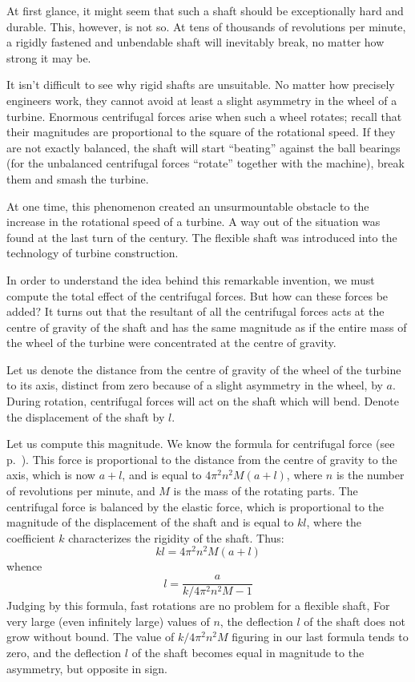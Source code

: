 At first glance, it might seem that such a shaft should
be exceptionally hard and durable. This, however, is
not so. At tens of thousands of revolutions per minute,
a rigidly fastened and unbendable shaft will inevitably
break, no matter how strong it may be.

It isn't difficult to see why rigid shafts are unsuitable.
No matter how precisely engineers work, they cannot
avoid at least a slight asymmetry in the wheel of a turbine.
Enormous centrifugal forces arise when such a wheel
rotates; recall that their magnitudes are proportional to
the square of the rotational speed. If they are not exactly
balanced, the shaft will start ``beating'' against the ball
bearings (for the unbalanced centrifugal forces ``rotate''
together with the machine), break them and smash the
turbine.

At one time, this phenomenon created an unsurmountable obstacle to the increase in the rotational speed of
a turbine. A way out of the situation was found at the
last turn of the century. The flexible shaft was introduced
into the technology of turbine construction.

In order to understand the idea behind this remarkable
invention, we must compute the total effect of the centrifugal forces. But how can these forces be added? It turns
out that the resultant of all the centrifugal forces acts
at the centre of gravity of the shaft and has the same magnitude as if the entire mass of the wheel of the turbine were
concentrated at the centre of gravity.

Let us denote the distance from the centre of gravity
of the wheel of the turbine to its axis, distinct from zero
because of a slight asymmetry in the wheel, by $a$. During
rotation, centrifugal forces will act on the shaft which
will bend. Denote the displacement of the shaft by $l$.

Let us compute this magnitude. We know the formula
for centrifugal force (see p.~\pageref{centrifugal}). This force is proportional
to the distance from the centre of gravity to the axis,
which is now $a+l$, and is equal to $4 \pi^{2} n^{2} M (a + l)$,
where $n$ is the number of revolutions per minute, and $M$
is the mass of the rotating parts. The centrifugal force is
balanced by the elastic force, which is proportional to the
magnitude of the displacement of the shaft and is equal
to $kl$, where the coefficient $k$ characterizes the rigidity of
the shaft. Thus:
 \begin{equation*}%
kl= 4 \pi^{2} n^{2} M (a+l)
 \end{equation*}
whence
 \begin{equation*}%
l= \dfrac{a}{k/4 \pi^{2} n^{2} M - 1}
 \end{equation*}
Judging by this formula, fast rotations are no problem
for a flexible shaft, For very large (even infinitely large)
values of $n$, the deflection $l$ of the shaft does not grow
without bound. The value of $k/4 \pi^{2} n^{2} M$ figuring in our
last formula tends to zero, and the deflection $l$ of the shaft
becomes equal in magnitude to the asymmetry, but opposite in sign.

